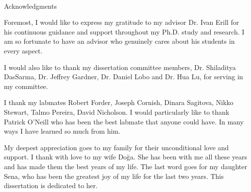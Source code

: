 
\renewcommand{\baselinestretch}{2}
\small\normalsize
\hbox{\ }

\vspace{-.65in}

\begin{center}
\large{Acknowledgments}
\end{center}

\vspace{1ex}

Foremost, I would like to express my gratitude to my advisor Dr. Ivan Erill for
his continuous guidance and support throughout my Ph.D. study and research. I
am so fortunate to have an advisor who genuinely cares about his students in
every aspect.

I would also like to thank my dissertation committee members, Dr. Shiladitya
DasSarma, Dr. Jeffrey Gardner, Dr. Daniel Lobo and Dr. Hua Lu, for serving in
my committee.

I thank my labmates Robert Forder, Joseph Cornish, Dinara Sagitova, Nikko
Stewart, Talmo Pereira, David Nicholson. I would particularly like to thank
Patrick O'Neill who has been the best labmate that anyone could have. In many
ways I have learned so much from him.

My deepest appreciation goes to my family for their unconditional love and
support. I thank with love to my wife Doğa. She has been with me all these
years and has made them the best years of my life. The last word goes for my
daughter Sena, who has been the greatest joy of my life for the last two
years. This dissertation is dedicated to her.
